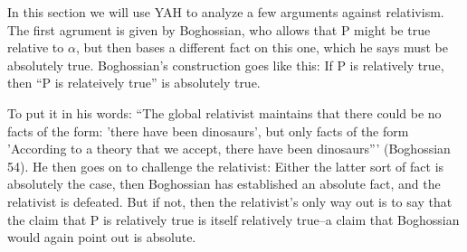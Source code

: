 \documentclass[12pt]{article}
\begin{document}
\begin{flushleft}
In this section we will use YAH to analyze a few arguments against relativism.
The first agrument is given by Boghossian, who allows that P might be true relative to $\alpha$, but then bases a different fact on this one, which he says must be absolutely true.
Boghossian's construction goes like this:
If P is relatively true, then ``P is relateively true'' is absolutely true.

To put it in his words: ``The global relativist maintains that there could be no facts of the form: 'there have been dinosaurs', but only facts of the form 'According to a theory that we accept, there have been dinosaurs''' (Boghossian 54).
He then goes on to challenge the relativist:
Either the latter sort of fact is absolutely the case, then Boghossian has established an absolute fact, and the relativist is defeated.
But if not, then the relativist's only way out is to say that the claim that P is relatively true is itself relatively true--a claim that Boghossian would again point out is absolute.


\end{flushleft}
\end{document}
